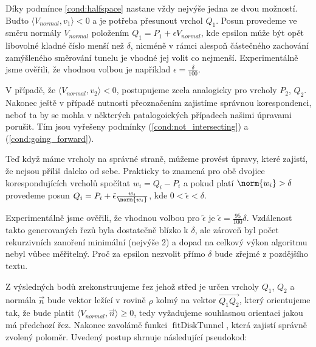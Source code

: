 Díky podmínce \ref{cond:halfspace} nastane vždy nejvýše jedna
ze dvou možností. Buďto $ \langle V_{normal}, v_1\rangle < 0 $ a je potřeba
přesunout vrchol $ Q_1 $. Posun provedeme ve směru normály $ V_{normal} $ položením
$ Q_1 = P_1 + \epsilon V_{normal} $, kde epsilon může být opět libovolné
kladné číslo menší než $ \delta $, nicméně v rámci alespoň částečného zachování
zamýšleného směrování tunelu je vhodné jej volit co nejmenší. Experimentálně
jsme ověřili, že vhodnou volbou je například $ \epsilon = \frac{\delta}{100} $.

V případě, že $ \langle V_{normal}, v_2\rangle < 0 $, postupujeme zcela analogicky
pro vrcholy $ P_2 $, $ Q_2 $. Nakonec ještě v případě nutnosti přeoznačením
zajistíme správnou korespondenci, neboť ta by se mohla v některých patalogoických
případech našimi úpravami porušit. Tím jsou vyřešeny podmínky
(\ref{cond:not_intersecting}) a (\ref{cond:going_forward}).

Teď když máme vrcholy na správné straně, můžeme provést úpravy, které zajistí,
že nejsou příliš daleko od sebe. Prakticky to znamená pro obě dvojice
korespondujících vrcholů spočítat $ w_i = Q_i - P_i $ a pokud platí
$ \norm{w_i} > \delta $ provedeme posun
$ Q_i = P_i + \tilde{\epsilon} \frac{w_i}{\norm{w_i}} $, kde
$ 0 < \tilde{\epsilon} < \delta $.

Experimentálně jsme ověřili, že vhodnou volbou pro $ \tilde{\epsilon} $ je
$ \tilde{\epsilon} = \frac{95}{100} \delta$. Vzdálenost takto generovaných řezů
byla dostatečně blízko k $ \delta $, ale zároveň byl počet rekurzivních zanoření
minimální (nejvýše 2) a dopad na celkový výkon algoritmu nebyl vůbec měřitelný.
Proč za epsilon nezvolit přímo $ \delta $ bude zřejmé z pozdějšího textu.

Z výsledných bodů zrekonstruujeme řez jehož střed je určen vrcholy
$ Q_1 $, $ Q_2 $ a normála $ \vec{n} $ bude vektor ležící v rovině $ \rho $
kolmý na vektor $ \overrightarrow{Q_1 Q_2} $, který orientujeme tak, že bude platit
$ \langle V_{normal}, \vec{n} \rangle \geq 0 $, tedy vyžadujeme souhlasnou
orientaci jakou má předchozí řez. Nakonec zavolámě funkci
$ \operatorname{fitDiskTunnel} $, která zajistí správně zvolený poloměr.
Uvedený postup shrnuje následující pseudokod:


